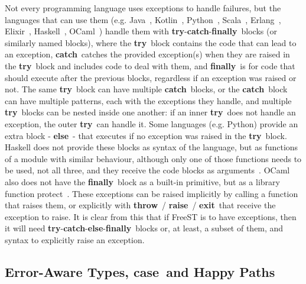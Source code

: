 \documentclass[sigplan]{acmart}
\newcommand{\syntax}[1]{\textbf{#1}}
\newcommand{\tryb}{\syntax{try}}
\newcommand{\catchb}{\syntax{catch}}
\newcommand{\finallyb}{\syntax{finally}}
\newcommand{\elseb}{\syntax{else}}
\newcommand{\throwb}{\syntax{throw}}
\newcommand{\raiseb}{\syntax{raise}}
\newcommand{\exitb}{\syntax{exit}}
\newcommand{\caseb}{\syntax{case}}
\begin{document}
Not every programming language uses exceptions to handle failures, but the languages that can use them (e.g. Java~\cite{javabook,javaexceptions,javaeh}, Kotlin~\cite{kotlinbook,kotlineh}, Python~\cite{pythonbook,pythoneh}, Scala~\cite{scalabook,scalaeh}, Erlang~\cite{erlangbookeh,erlangeh}, Elixir~\cite{elixirbookeh,elixireh}, Haskell~\cite{haskellbookeh,haskelleh}, OCaml~\cite{ocamlbook,ocamleh}) handle them with \tryb-\catchb-\finallyb~blocks (or similarly named blocks), where the \tryb~block contains the code that can lead to an exception, \catchb~catches the provided exception(s) when they are raised in the \tryb~block and includes code to deal with them, and \finallyb~is for code that should execute after the previous blocks, regardless if an exception was raised or not.
The same \tryb~block can have multiple \catchb~blocks, or the \catchb~block can have multiple patterns, each with the exceptions they handle, and multiple \tryb~blocks can be nested inside one another: if an inner \tryb~does not handle an exception, the outer \tryb~can handle it.
Some languages (e.g. Python) provide an extra block - \elseb~- that executes if no exception was raised in the \tryb~block.
Haskell does not provide these blocks as syntax of the language, but as functions of a module with similar behaviour, although only one of those functions needs to be used, not all three, and they receive the code blocks as arguments~\cite{haskelleh}.
OCaml also does not have the \finallyb~block as a built-in primitive, but as a library function protect~\cite{ocamleh}.
These exceptions can be raised implicitly by calling a function that raises them, or explicitly with \throwb~/ \raiseb~/ \exitb~that receive the exception to raise.
It is clear from this that if FreeST is to have exceptions, then it will need \tryb-\catchb-\elseb-\finallyb~blocks or, at least, a subset of them, and syntax to explicitly raise an exception.

\subsection{Error-Aware Types, \caseb~and Happy Paths}
\end{document}
